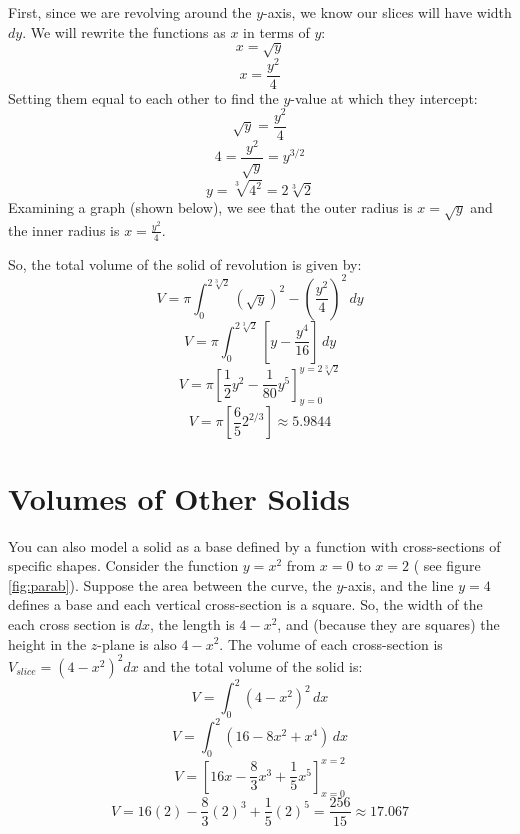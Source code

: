 \begin{Answer}[ref = volume 2]
First, since we are revolving around the $y$-axis, we know our slices will 
have width $dy$. We will rewrite the functions as $x$ in terms of $y$:
$$x = \sqrt{y}$$
$$x = \frac{y^2}{4}$$
Setting them equal to each other to find the $y$-value at which they intercept:
$$\sqrt{y} = \frac{y^2}{4}$$
$$4 = \frac{y^2}{\sqrt{y}} = y^{3/2}$$
$$y = \sqrt[3]{4^2} = 2\sqrt[3]{2}$$
Examining a graph (shown below), we see that the outer radius is $x = \sqrt{y}$
and the inner radius is $x = \frac{y^2}{4}$. 


So, the total volume of the solid of revolution is given by:
$$V = \pi \int_0^{2\sqrt[3]{2}} \left(\sqrt{y} \right)^2 - \left( \frac{y^2}{4} 
\right)^2\,dy$$
$$V = \pi \int_0^{2\sqrt[3]{2}} \left[ y - \frac{y^4}{16} \right]\,dy$$
$$V = \pi \left[ \frac{1}{2}y^2 - \frac{1}{80}y^5 \right]_{y = 0}^{y = 
2\sqrt[3]{2}}$$
$$V = \pi \left[ \frac{6}{5} 2^{2/3} \right] \approx 5.9844$$
\end{Answer}

\section{Volumes of Other Solids}
You can also model a solid as a base defined by a function with cross-sections 
of specific shapes. Consider the function $y = x^2$ from $x = 0$ to $x = 2$ (
see figure \ref{fig:parab}). Suppose the area between the curve, the $y$-axis, 
and the line $y = 4$ defines a base and each vertical cross-section is a 
square. So, the width of the each cross section is $dx$, the length is $4 - 
x^2$, and (because they are squares) the height in the $z$-plane is also $4 - 
x^2$. The volume of each cross-section is $V_{slice} = \left(4 - x^2 
\right)^2 dx$ and the total volume of the solid is:
$$V = \int_0^2 \left(4 - x^2 \right) ^ 2\,dx$$
$$V = \int_0^2 \left( 16 - 8x^2 + x^4 \right)\,dx$$
$$V = \left[16x - \frac{8}{3}x^3 + \frac{1}{5}x^5 \right]_{x = 0}^{x = 2}$$
$$V = 16(2) - \frac{8}{3}(2)^3 + \frac{1}{5}(2)^5 = \frac{256}{15} 
\approx 17.067$$


